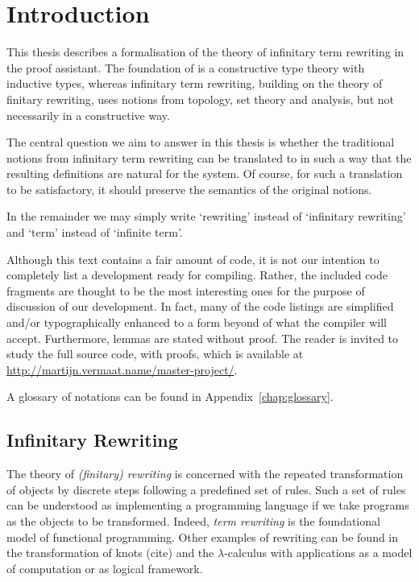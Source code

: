\chapter{Introduction}
\setcounter{page}{1}

This thesis describes a formalisation of the theory of infinitary term
rewriting in the \Coq proof assistant. The foundation of \Coq is a
constructive type theory with inductive types, whereas infinitary term
rewriting, building on the theory of finitary rewriting, uses notions
from topology, set theory and analysis, but not necessarily in a
constructive way.

The central question we aim to answer in this thesis is whether the
traditional notions from infinitary term rewriting can be translated
to \Coq in such a way that the resulting definitions are natural for
the \Coq system. Of course, for such a translation to be satisfactory,
it should preserve the semantics of the original notions.


In the remainder we may simply write `rewriting' instead of
`infinitary rewriting' and `term' instead of `infinite
term'.

Although this text contains a fair amount of \Coq code, it is not our
intention to completely list a development ready for compiling. Rather, the
included code fragments are thought to be the most interesting ones for the
purpose of discussion of our development. In fact, many of the code listings
are simplified and/or typographically enhanced to a form beyond of what the
\Coq compiler will accept. Furthermore, lemmas are stated without proof. The
reader is invited to study the full source code, with proofs, which is
available at \url{http://martijn.vermaat.name/master-project/}.

A glossary of notations can be found in Appendix~\ref{chap:glossary}.


\section*{Infinitary Rewriting}

The theory of \emph{(finitary) rewriting} is concerned with the
repeated transformation of objects by discrete steps following a
predefined set of rules. Such a set of rules can be understood as
implementing a programming language if we take programs as the objects
to be transformed. Indeed, \emph{term rewriting} is the foundational
model of functional programming. Other examples of rewriting can be
found in the transformation of knots (cite) and the $\lambda$-calculus
with applications as a model of computation or as logical framework.


